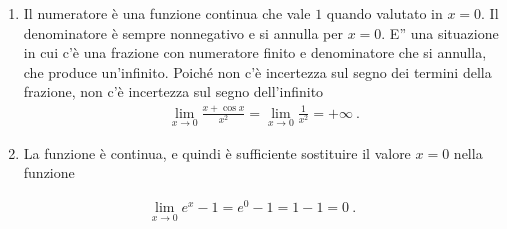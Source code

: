 \documentclass[letterpaper,10pt,italian]{jupyterBook}
\begin{document}
\begin{enumerate}
\item {} 
\sphinxAtStartPar
Il numeratore è una funzione continua che vale \(1\) quando valutato in \(x = 0\). Il denominatore è sempre non\sphinxhyphen{}negativo e si annulla per \(x = 0\). E” una situazione in cui c’è una frazione con numeratore finito e denominatore che si annulla, che produce un’infinito. Poiché non c’è incertezza sul segno dei termini della frazione, non c’è incertezza sul segno dell’infinito
\begin{equation*}
\begin{split}\lim_{x \to 0} \frac{x + \cos x}{x^2} = \lim_{x \to 0} \frac{1}{x^2} = + \infty \ .\end{split}
\end{equation*}
\item {} 
\sphinxAtStartPar
La funzione è continua, e quindi è sufficiente sostituire il valore \(x = 0\) nella funzione

\end{enumerate}
\begin{equation*}
\begin{split}\lim_{x \to 0} e^x - 1 = e^0 - 1 = 1 - 1 = 0 \ .\end{split}
\end{equation*} \label{exercise:ch/infinitesimal_calculus/analysis-problems-exercise-2}
\end{document}
